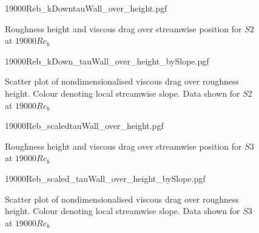 \begin{figure}[h!]
    \centering
    {19000Reb_kDowntauWall_over_height.pgf}
    \caption{Roughness height and viscous drag over streamwise position for  $S2$ at $19000 Re_b$}
\end{figure}
\begin{figure}[h!]
    \centering
    \hspace{0.9cm}
    {19000Reb_kDown_tauWall_over_height_bySlope.pgf}
    \caption[Scatterplot of viscous drag over physical roughness height at $Re_b = 19000$ for $S2$]{Scatter plot of nondimensionalised viscous drag over roughness height. Colour denoting local streamwise slope. Data shown for $S2$ at $19000 Re_b$}
\end{figure}
\begin{figure}[h!]
    \centering
    {19000Reb_scaledtauWall_over_height.pgf}
    \caption{Roughness height and viscous drag over streamwise position for  $S3$ at $19000 Re_b$}
\end{figure}
\begin{figure}[h!]
    \centering
    \hspace{0.9cm}
    {19000Reb_scaled_tauWall_over_height_bySlope.pgf}
    \caption[Scatterplot of viscous drag over physical roughness height at $Re_b = 19000$ for $S3$]{Scatter plot of nondimensionalised viscous drag over roughness height. Colour denoting local streamwise slope. Data shown for $S3$ at $19000 Re_b$}
\end{figure}
